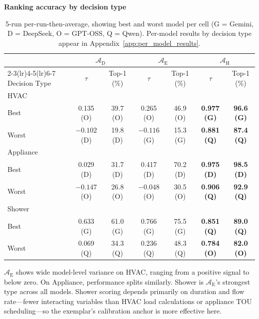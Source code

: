 \documentclass[final,3p,times]{elsarticle}
\begin{document}
\begin{table}[t]
\begin{threeparttable}
\footnotesize
\centering
\textbf{Ranking accuracy by decision type}
\renewcommand{\arraystretch}{1.15}
\begin{tabular}{lcccccc}
\toprule
 & \multicolumn{2}{c}{$\mathcal{A}_{\text{D}}$} & \multicolumn{2}{c}{$\mathcal{A}_{\text{E}}$} & \multicolumn{2}{c}{$\mathcal{A}_{\text{H}}$} \\
\cmidrule(lr){2-3}\cmidrule(lr){4-5}\cmidrule(lr){6-7}
Decision Type & $\tau$ & Top-1 (\%) & $\tau$ & Top-1 (\%) & $\tau$ & Top-1 (\%) \\
\midrule
HVAC & & & & & & \\
\quad Best & 0.135 (O) & 39.7 (O) & 0.265 (O) & 46.9 (O) & \textbf{0.977 (G)} & \textbf{96.6 (G)} \\
\quad Worst & $-0.102$ (D) & 19.8 (D) & $-0.116$ (G) & 15.3 (G) & \textbf{0.881 (Q)} & \textbf{87.4 (Q)} \\
Appliance & & & & & & \\
\quad Best & 0.029 (D) & 31.7 (D) & 0.417 (D) & 70.2 (D) & \textbf{0.975 (D)} & \textbf{98.5 (D)} \\
\quad Worst & $-0.147$ (O) & 26.8 (O) & $-0.048$ (O) & 30.5 (O) & \textbf{0.906 (Q)} & \textbf{92.9 (Q)} \\
Shower & & & & & & \\
\quad Best & 0.633 (G) & 61.0 (G) & 0.766 (G) & 75.5 (G) & \textbf{0.851 (Q)} & \textbf{89.0 (Q)} \\
\quad Worst & 0.069 (Q) & 34.3 (Q) & 0.236 (Q) & 48.3 (Q) & \textbf{0.784 (O)} & \textbf{82.0 (O)} \\
\bottomrule
\end{tabular}
\renewcommand{\arraystretch}{1.0}
\caption{5-run per-run-then-average, showing best and worst model per cell (G = Gemini, D = DeepSeek, O = GPT-OSS, Q = Qwen). Per-model results by decision type appear in Appendix~\ref{app:per_model_results}.}
\label{tab:item7}
\end{threeparttable}
\end{table}

$\mathcal{A}_{\text{E}}$ shows wide model-level variance on HVAC, ranging from a positive signal to below zero. On Appliance, performance splits similarly. Shower is $\mathcal{A}_{\text{E}}$'s strongest type across all models. Shower scoring depends primarily on duration and flow rate---fewer interacting variables than HVAC load calculations or appliance TOU scheduling---so the exemplar's calibration anchor is more effective here.
\end{document}

